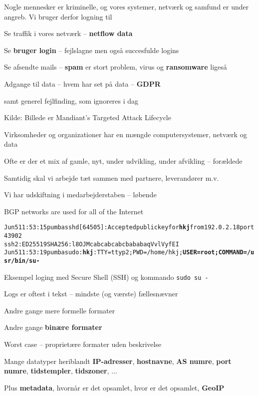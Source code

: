 \documentclass[Screen16to9,17pt]{foils}
\begin{document}
Nogle mennesker er kriminelle, og vores systemer, netværk og samfund er under angreb. Vi bruger derfor logning til
\begin{list2}
\item Se traffik i vores netværk -- {\bf netflow data}
\item Se {\bf bruger login} -- fejlslagne men også succesfulde logins
\item Se afsendte mails -- {\bf spam} er stort problem, {virus og \bf ransomware} ligeså
\item Adgange til data -- hvem har set på data -- {\bf GDPR}
\item samt generel fejlfinding, som ignoreres i dag
\end{list2}

Kilde: Billede er Mandiant’s Targeted Attack Lifecycle





\begin{list2}
\item Virksomheder og organizationer har en mængde computersystemer, netværk og data
\item Ofte er der et mix af gamle, nyt, under udvikling, under afvikling -- forældede
\item Samtidig skal vi arbejde tæt sammen med partnere, leverandører m.v.
\item Vi har udskiftning i medarbejderstaben -- løbende
\end{list2}




\centerline{BGP networks are used for all of the Internet}



\begin{alltt}\small
Jun  5 11:53:15 pumba sshd[64505]: Accepted publickey for {\bf hkj} from 192.0.2.18 port 43902
ssh2: ED25519 SHA256:l8OJMcabcabcabcbababaqVvlVyfEI
Jun  5 11:53:19 pumba sudo: {\bf hkj} : TTY=ttyp2 ; PWD=/home/hkj ; {\bf USER=root ; COMMAND=/usr/bin/su -}
\end{alltt}
Eksempel loging med Secure Shell (SSH) og kommando \verb+sudo su -+

\begin{list2}
\item Logs er oftest i tekst -- mindste (og værste) fællesnævner
\item Andre gange mere formelle formater
\item Andre gange {\bf binære formater}
\item Worst case -- proprietære formater uden beskrivelse
\item Mange datatyper heriblandt {\bf IP-adresser}, {\bf hostnavne}, {\bf AS numre}, {\bf port numre}, {\bf tidstempler}, {\bf tidszoner}, ...
\item Plus {\bf metadata}, hvornår er det opsamlet, hvor er det opsamlet, {\bf GeoIP}
\end{list2}
\end{document}
